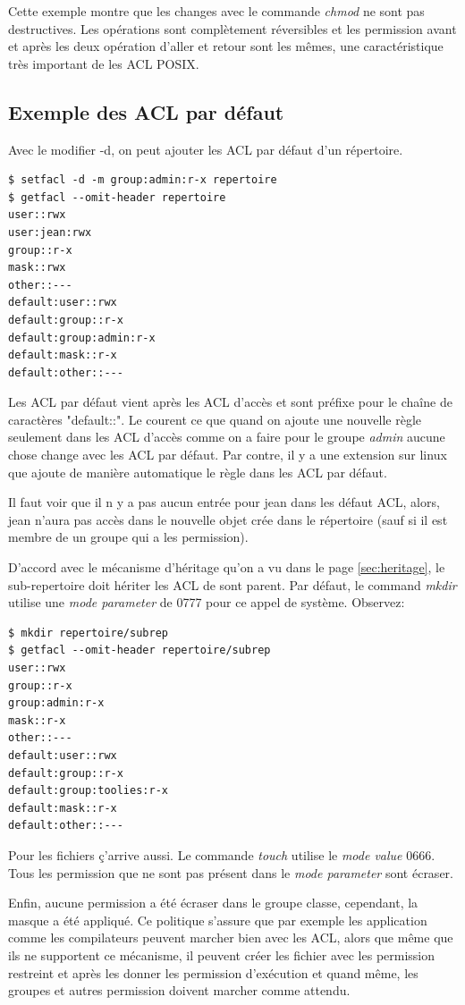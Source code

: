 Cette exemple montre que les changes avec le commande \emph{chmod} ne sont pas destructives. Les opérations sont complètement réversibles et les permission avant et après les deux opération d'aller et retour sont les mêmes, une caractéristique très important de les ACL POSIX. 

\subsection*{Exemple des ACL par défaut}

Avec le modifier -d, on peut ajouter les ACL par défaut d'un répertoire. 

\begin{verbatim}
$ setfacl -d -m group:admin:r-x repertoire 
$ getfacl --omit-header repertoire 
user::rwx
user:jean:rwx
group::r-x 
mask::rwx
other::---
default:user::rwx
default:group::r-x
default:group:admin:r-x
default:mask::r-x
default:other::---
\end{verbatim} 

Les ACL par défaut vient après les ACL d'accès et sont préfixe pour le chaîne de caractères "default::". Le courent ce que quand on ajoute une nouvelle règle seulement dans les ACL d'accès comme on a faire pour le groupe \emph{admin} aucune chose change avec les ACL par défaut. Par contre, il y a une extension sur linux que ajoute de manière automatique le règle dans les ACL par défaut. 

Il faut voir que il n y a pas aucun entrée pour jean dans les défaut ACL, alors, jean n'aura pas accès dans le nouvelle objet crée dans le répertoire (sauf si il est membre de un groupe qui a les permission). 

D'accord avec le mécanisme d'héritage qu'on a vu dans le page \ref{sec:heritage}, le sub-repertoire doit hériter les ACL de sont parent. Par défaut, le command \emph{mkdir} utilise une \emph{mode parameter} de 0777 pour ce appel de système. Observez:

\begin{verbatim}
$ mkdir repertoire/subrep 
$ getfacl --omit-header repertoire/subrep 
user::rwx 
group::r-x 
group:admin:r-x 
mask::r-x 
other::--- 
default:user::rwx 
default:group::r-x 
default:group:toolies:r-x 
default:mask::r-x 
default:other::---
\end{verbatim}

Pour les fichiers ç'arrive aussi. Le commande \emph{touch} utilise le \emph{mode value} 0666. Tous les permission que ne sont pas présent dans le \emph{mode parameter} sont écraser.

Enfin, aucune permission a été écraser dans le groupe classe, cependant, la masque a été appliqué. Ce politique s'assure que par exemple les application comme les compilateurs peuvent marcher bien avec les ACL, alors que même que ils ne supportent ce mécanisme, il peuvent créer les fichier avec les permission restreint et après les donner les permission d'exécution et quand même, les groupes et autres permission doivent marcher comme attendu. 


